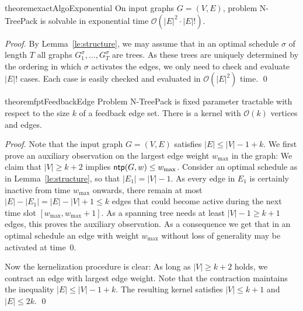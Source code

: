 \documentclass[runningheads]{llncs}
\newcommand{\bigO}{\mathcal{O}}
\newcommand{\xxxNTP}{{\sc N-TreePack}}
\DeclareMathOperator{\ntp}{\text{\sf ntp}}
\begin{document}
\begin{restatable}{theorem}{exactAlgoExponential}
\label{th:exact}
On input graphs $G=(V,E)$, problem {\xxxNTP} is solvable in exponential time $\bigO(|E|^2\cdot|E|!)$. 
\end{restatable}
\begin{proof}
By Lemma~\ref{le:structure}, we may assume that in an optimal schedule $\sigma$ of length $T$ 
all graphs $G_1^\sigma, \dots, G_T^\sigma$ are trees.
As these trees are uniquely determined by the ordering in which $\sigma$ activates the edges,
we only need to check and evaluate $|E|!$ cases.
Each case is easily checked and evaluated in $\bigO(|E|^2)$ time.
\qed
\end{proof}

\begin{restatable}{theorem}{fptFeedbackEdge}
\label{thm:FPT_feedback_edge_set}
Problem {\xxxNTP} is fixed parameter tractable with respect to the size $k$ of a feedback edge set. 
There is a kernel with $\bigO(k)$ vertices and edges. 
\end{restatable}
\begin{proof}
Note that the input graph $G=(V,E)$ satisfies $|E|\le|V|-1+k$.
We first prove an auxiliary observation on the largest edge weight $w_{\max}$ in the graph:
We claim that $|V|\ge k+2$ implies $\ntp(G,w)\le w_{\max}$. 
Consider an optimal schedule as in Lemma~\ref{le:structure}, so that $|E_1|=|V|-1$.
As every edge in $E_1$ is certainly inactive from time $w_{\max}$ onwards, there remain at most 
$|E|-|E_1|=|E|-|V|+1\le k$ edges that could become active during the next time slot $[w_{\max},w_{\max}+1]$.
As a spanning tree needs at least $|V|-1\ge k+1$ edges, this proves the auxiliary observation.
As a consequence we get that in an optimal schedule an edge with weight $w_{\max}$ without loss 
of generality may be activated at time~$0$.

Now the kernelization procedure is clear:
As long as $|V|\ge k+2$ holds, we contract an edge with largest edge weight.
Note that the contraction maintains the inequality $|E|\le|V|-1+k$.
The resulting kernel satisfies $|V|\le k+1$ and $|E|\le2k$.
\qed
\end{proof}
\end{document}
